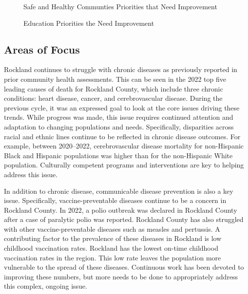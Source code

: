 \documentclass[
  english,
  letterpaper,
]{report}
\begin{document}
\begin{figure}


\caption{\label{fig-safe-health-need-improve}Safe and Healthy Communties
Priorities that Need Improvement}

\end{figure}%

\begin{figure}


\caption{\label{fig-educat-need-improv}Education Priorities the Need
Improvement}

\end{figure}%

\subsection{Areas of Focus}\label{areas-of-focus-3}

Rockland continues to struggle with chronic diseases as previously
reported in prior community health assessments. This can be seen in the
2022 top five leading causes of death for Rockland County, which include
three chronic conditions: heart disease, cancer, and cerebrovascular
disease. During the previous cycle, it was an expressed goal to look at
the core issues driving these trends. While progress was made, this
issue requires continued attention and adaptation to changing
populations and needs. Specifically, disparities across racial and
ethnic lines continue to be reflected in chronic disease outcomes. For
example, between 2020--2022, cerebrovascular disease mortality for
non-Hispanic Black and Hispanic populations was higher than for the
non-Hispanic White population. Culturally competent programs and
interventions are key to helping address this issue.

In addition to chronic disease, communicable disease prevention is also
a key issue. Specifically, vaccine-preventable diseases continue to be a
concern in Rockland County. In 2022, a polio outbreak was declared in
Rockland County after a case of paralytic polio was reported. Rockland
County has also struggled with other vaccine-preventable diseases such
as measles and pertussis. A contributing factor to the prevalence of
these diseases in Rockland is low childhood vaccination rates. Rockland
has the lowest on-time childhood vaccination rates in the region. This
low rate leaves the population more vulnerable to the spread of these
diseases. Continuous work has been devoted to improving these numbers,
but more needs to be done to appropriately address this complex, ongoing
issue.
\end{document}
